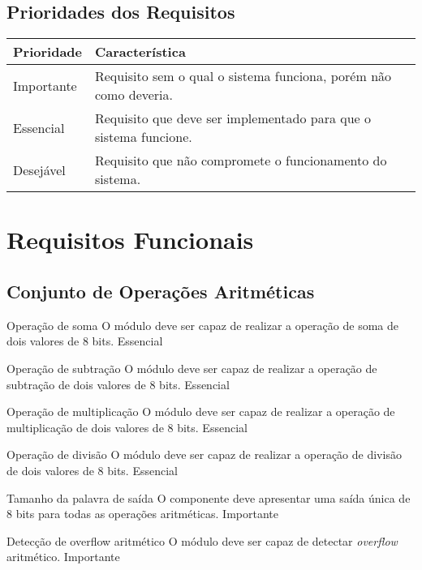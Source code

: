 \documentclass{article}
\begin{document}
  \subsection{Prioridades dos Requisitos}
    \FloatBarrier
    \begin{table}[H]
      \begin{center}
        \begin{tabular}[pos]{|m{2cm} | m{12cm}|} 
          \hline
          \cellcolor[gray]{0.9}\textbf{Prioridade} & \cellcolor[gray]{0.9}\textbf{Característica} \\ \hline
          Importante      & Requisito sem o qual o sistema funciona, porém não como deveria.  \\ \hline
          Essencial       & Requisito que deve ser implementado para que o sistema funcione.  \\ \hline
          Desejável       & Requisito que não compromete o funcionamento do sistema.  \\ \hline
        \end{tabular}
      \end{center}
    \end{table}  

\section{Requisitos Funcionais}


  \subsection{Conjunto de Operações Aritméticas} 
  
    \begin{functional}
      \requirement
      {Operação de soma}
      {O módulo deve ser capaz de realizar a operação de soma de dois valores de 8 bits.}
      {Essencial}

      \requirement
      {Operação de subtração}
      {O módulo deve ser capaz de realizar a operação de subtração de dois valores de 8 bits.}
      {Essencial}

      \requirement
      {Operação de multiplicação}
      {O módulo deve ser capaz de realizar a operação de multiplicação de dois valores de 8 bits. }
      {Essencial}

      \requirement
      {Operação de divisão}
      {O módulo deve ser capaz de realizar a operação de divisão de dois valores de 8 bits.}
      {Essencial} 

      \requirement
      {Tamanho da palavra de saída}
      {O componente deve apresentar uma saída única de 8 bits para todas as operações aritméticas.}
      {Importante}       

      \requirement
      {Detecção de overflow aritmético}
      {O módulo deve ser capaz de detectar \textit{overflow} aritmético.}
      {Importante}
    \end{functional}
\end{document}
